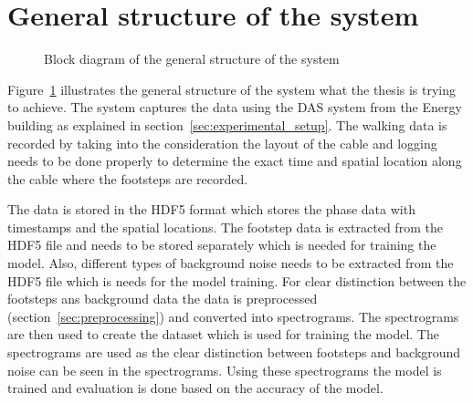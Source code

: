 \section{General structure of the system}
\begin{figure}[ht]
    \centering
    \caption{Block diagram of the general structure of the system}
    \label{fig:footstep-pipeline}
  \end{figure}
  
  Figure~\ref{fig:footstep-pipeline} illustrates the general structure of the system what the thesis is trying to achieve. The system captures the data using the DAS system from the Energy building as explained in section~\ref{sec:experimental_setup}. The walking data is recorded by taking into the consideration the layout of the cable and logging needs to be done properly to determine the exact time and spatial location along the cable where the footsteps are recorded. 

  The data is stored in the HDF5 format which stores the phase data with timestamps and the spatial locations. The footstep data is extracted from the HDF5 file and needs to be stored separately which is needed for training the model. Also, different types of background noise needs to be extracted from the HDF5 file which is needs for the model training. For clear distinction between the footsteps ans background data the data is preprocessed (section~\ref{sec:preprocessing}) and converted into spectrograms. The spectrograms are then used to create the dataset which is used for training the model. The spectrograms are used as the clear distinction between footsteps and background noise can be seen in the spectrograms. Using these spectrograms the model is trained and evaluation is done based on the accuracy of the model. 
  
